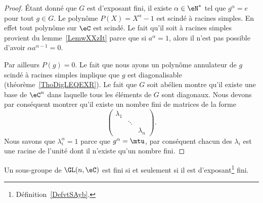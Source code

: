 \begin{proof}
	Étant donné que \( G\) est d'exposant fini, il existe \( \alpha\in \eN^*\) tel que \( g^{\alpha}=e\) pour tout \( g\in G\). Le polynôme \( P(X)=X^{\alpha}-1\) est scindé à racines simples. En effet tout polynôme sur \( \eC\) est scindé. Le fait qu'il soit à racines simples provient du lemme~\ref{LemwXXzIt} parce que si \( a^{\alpha}=1\), alors il n'est pas possible d'avoir \( \alpha a^{\alpha-1}=0\).

	Par ailleurs \( P(g)=0\). Le fait que nous ayons un polynôme annulateur de \( g\) scindé à racines simples implique que \( g\) est diagonalisable (théorème~\ref{ThoDigLEQEXR}). Le fait que \( G\) soit abélien montre qu'il existe une base de \( \eC^n\) dans laquelle tous les éléments de \( G\) sont diagonaux. Nous devons par conséquent montrer qu'il existe un nombre fini de matrices de la forme
	\begin{equation}
		\begin{pmatrix}
			\lambda_1 &        &           \\
			          & \ddots &           \\
			          &        & \lambda_n
		\end{pmatrix}.
	\end{equation}
	Nous savons que \( \lambda_i^{\alpha}=1\) parce que \( g^{\alpha}=\mtu\), par conséquent chacun des \( \lambda_i\) est une racine de l'unité dont il n'existe qu'un nombre fini.
\end{proof}

\begin{theorem}\label{ThooJLTit}
	Un sous-groupe de \( \GL(n,\eC)\) est fini si et seulement si il est d'exposant\footnote{Définition~\ref{DefvtSAyb}.} fini.
\end{theorem}

